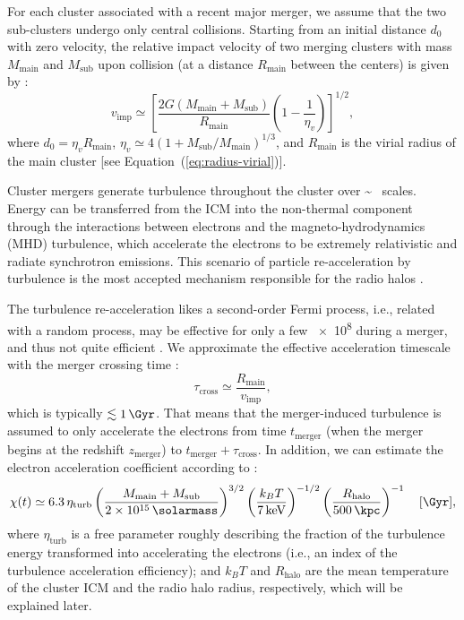 \documentclass[modern]{aastex61}
\newcommand{\R}[1]{\mathrm{#1}}
\begin{document}
For each cluster associated with a recent major merger, we assume that
the two sub-clusters undergo only central collisions.
Starting from an initial distance $d_0$ with zero velocity,
the relative impact velocity of two merging clusters with mass
$M_{\R{main}}$ and $M_{\R{sub}}$ upon collision (at a distance
$R_{\R{main}}$ between the centers) is given by
\citep{cassano2005,sarazin2002}:
\begin{equation}
  \label{eq:v-imp}
  v_{\R{imp}} \simeq \left[
    \frac{2G (M_{\R{main}} + M_{\R{sub}})}{R_{\R{main}}}
    \left( 1 - \frac{1}{\eta_v} \right)\right]^{1/2},
\end{equation}
where $d_0 = \eta_v R_{\R{main}}$,
$\eta_v \simeq 4 (1 + M_{\R{sub}}/M_{\R{main}})^{1/3}$,
and $R_{\R{main}}$ is the virial radius of the main cluster
[see Equation~(\ref{eq:radius-virial})].

Cluster mergers generate turbulence throughout the cluster over
\si{\sim \Mpc} scales.
Energy can be transferred from the ICM into the non-thermal
component through the interactions between electrons and the
magneto-hydrodynamics (MHD) turbulence, which accelerate the electrons
to be extremely relativistic and radiate synchrotron emissions.
This scenario of particle re-acceleration by turbulence is the most
accepted mechanism responsible for the radio halos \citep{feretti2012rev}.

The turbulence re-acceleration likes a second-order Fermi process, i.e.,
related with a random process, may be effective for only a few
\SI{e8}{\year} during a merger, and thus not quite efficient
\citep{feretti2012rev,ensslin2011}.
We approximate the effective acceleration timescale with the merger
crossing time \citep{cassano2005}:
\begin{equation}
  \label{eq:tau-cross}
  \tau_{\R{cross}} \simeq \frac{R_{\R{main}}}{v_{\R{imp}}},
\end{equation}
which is typically $\lesssim \SI{1}{\Gyr}$.
That means that the merger-induced turbulence is assumed to only accelerate
the electrons from time $t_{\R{merger}}$ (when the merger begins at the
redshift $z_{\R{merger}}$) to $t_{\R{merger}} + \tau_{\R{cross}}$.
In addition, we can estimate the electron acceleration coefficient
according to \citep{cassano2005}:
\begin{equation}
  \label{eq:electron-acc}
  \chi(t) \simeq 6.3 \,\eta_{\R{turb}}
      \left( \frac{M_{\R{main}} + M_{\R{sub}}}{\SI{2e15}{\solarmass}} \right)^{3/2}
      \left( \frac{k_BT}{\SI{7}{\keV}} \right)^{-1/2}
      \left( \frac{R_{\R{halo}}}{\SI{500}{\kpc}} \right)^{-1}
  \quad [\si{\per\Gyr}],
\end{equation}
where $\eta_{\R{turb}}$ is a free parameter roughly describing the fraction
of the turbulence energy transformed into accelerating the electrons (i.e.,
an index of the turbulence acceleration efficiency);
and $k_BT$ and $R_{\R{halo}}$ are the mean temperature of the cluster ICM
and the radio halo radius, respectively, which will be explained later.
\end{document}
